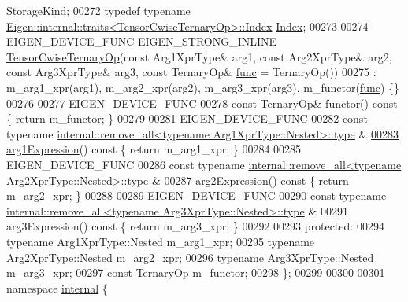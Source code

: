 \begin{DoxyCode}
       StorageKind;
00272     \textcolor{keyword}{typedef} \textcolor{keyword}{typename} \hyperlink{struct_eigen_1_1internal_1_1traits}{Eigen::internal::traits<TensorCwiseTernaryOp>::Index}
       \hyperlink{namespace_eigen_a62e77e0933482dafde8fe197d9a2cfde}{Index};
00273 
00274     EIGEN\_DEVICE\_FUNC EIGEN\_STRONG\_INLINE \hyperlink{class_eigen_1_1_tensor_cwise_ternary_op}{TensorCwiseTernaryOp}(\textcolor{keyword}{const} Arg1XprType& arg1,
       \textcolor{keyword}{const} Arg2XprType& arg2, \textcolor{keyword}{const} Arg3XprType& arg3, \textcolor{keyword}{const} TernaryOp& \hyperlink{structfunc}{func} = TernaryOp())
00275         : m\_arg1\_xpr(arg1), m\_arg2\_xpr(arg2), m\_arg3\_xpr(arg3), m\_functor(\hyperlink{structfunc}{func}) \{\}
00276 
00277     EIGEN\_DEVICE\_FUNC
00278     \textcolor{keyword}{const} TernaryOp& functor()\textcolor{keyword}{ const }\{ \textcolor{keywordflow}{return} m\_functor; \}
00279 
00281     EIGEN\_DEVICE\_FUNC
00282     \textcolor{keyword}{const} \textcolor{keyword}{typename} \hyperlink{group___sparse_core___module}{internal::remove\_all<typename Arg1XprType::Nested>::type}
      &
\hyperlink{class_eigen_1_1_tensor_cwise_ternary_op_a6e797469eff84e6b24dab5bf5f2c1da8}{00283}     \hyperlink{class_eigen_1_1_tensor_cwise_ternary_op_a6e797469eff84e6b24dab5bf5f2c1da8}{arg1Expression}()\textcolor{keyword}{ const }\{ \textcolor{keywordflow}{return} m\_arg1\_xpr; \}
00284 
00285     EIGEN\_DEVICE\_FUNC
00286     \textcolor{keyword}{const} \textcolor{keyword}{typename} \hyperlink{group___sparse_core___module}{internal::remove\_all<typename Arg2XprType::Nested>::type}
      &
00287     arg2Expression()\textcolor{keyword}{ const }\{ \textcolor{keywordflow}{return} m\_arg2\_xpr; \}
00288 
00289     EIGEN\_DEVICE\_FUNC
00290     \textcolor{keyword}{const} \textcolor{keyword}{typename} \hyperlink{group___sparse_core___module}{internal::remove\_all<typename Arg3XprType::Nested>::type}
      &
00291     arg3Expression()\textcolor{keyword}{ const }\{ \textcolor{keywordflow}{return} m\_arg3\_xpr; \}
00292 
00293   \textcolor{keyword}{protected}:
00294     \textcolor{keyword}{typename} Arg1XprType::Nested m\_arg1\_xpr;
00295     \textcolor{keyword}{typename} Arg2XprType::Nested m\_arg2\_xpr;
00296     \textcolor{keyword}{typename} Arg3XprType::Nested m\_arg3\_xpr;
00297     \textcolor{keyword}{const} TernaryOp m\_functor;
00298 \};
00299 
00300 
00301 \textcolor{keyword}{namespace }\hyperlink{namespaceinternal}{internal} \{

\end{DoxyCode}
